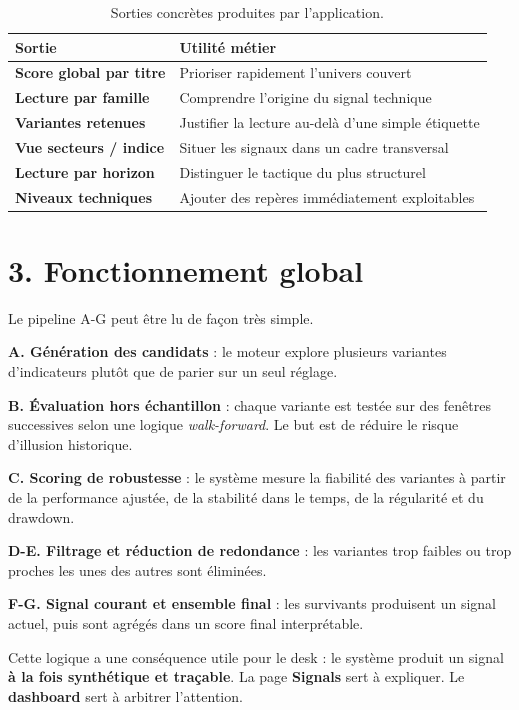 \documentclass[11pt,a4paper]{article}
\begin{document}
\begin{table}[H]
\centering
\small
\begin{tabularx}{\textwidth}{>{\bfseries}p{2.2cm}X}
\toprule
Sortie & Utilité métier \\
\midrule
Score global par titre & Prioriser rapidement l'univers couvert \\
Lecture par famille & Comprendre l'origine du signal technique \\
Variantes retenues & Justifier la lecture au-delà d'une simple étiquette \\
Vue secteurs / indice & Situer les signaux dans un cadre transversal \\
Lecture par horizon & Distinguer le tactique du plus structurel \\
Niveaux techniques & Ajouter des repères immédiatement exploitables \\
\bottomrule
\end{tabularx}
\caption{Sorties concrètes produites par l'application.}
\end{table}

\section*{3. Fonctionnement global}

Le pipeline A-G peut être lu de façon très simple.

\textbf{A. Génération des candidats} : le moteur explore plusieurs variantes d'indicateurs plutôt que de parier sur un seul réglage.

\textbf{B. Évaluation hors échantillon} : chaque variante est testée sur des fenêtres successives selon une logique \textit{walk-forward}. Le but est de réduire le risque d'illusion historique.

\textbf{C. Scoring de robustesse} : le système mesure la fiabilité des variantes à partir de la performance ajustée, de la stabilité dans le temps, de la régularité et du drawdown.

\textbf{D-E. Filtrage et réduction de redondance} : les variantes trop faibles ou trop proches les unes des autres sont éliminées.

\textbf{F-G. Signal courant et ensemble final} : les survivants produisent un signal actuel, puis sont agrégés dans un score final interprétable.

Cette logique a une conséquence utile pour le desk : le système produit un signal \textbf{à la fois synthétique et traçable}. La page \textbf{Signals} sert à expliquer. Le \textbf{dashboard} sert à arbitrer l'attention.
\end{document}
